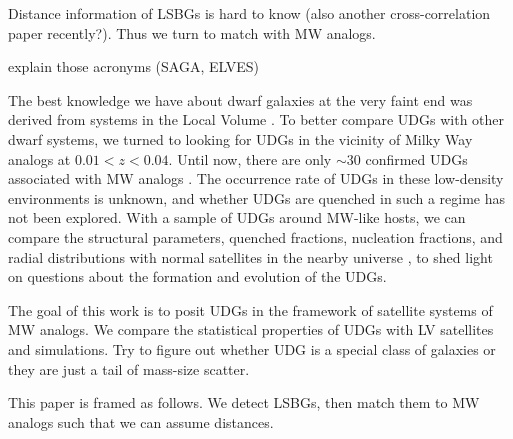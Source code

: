\documentclass[twocolumn,astrosymb,twocolappendix]{aastex631}
\begin{document}
\begin{CJK*}{UTF8}{gbsn}
Distance information of LSBGs is hard to know \citep{Kadowaki2021,Greene2022,Zaritsky2022} (also another cross-correlation paper recently?). Thus we turn to match with MW analogs.

explain those acronyms (SAGA, ELVES)

The best knowledge we have about dwarf galaxies at the very faint end was derived from systems in the Local Volume \citep[e.g.,][]{Simon2019,CarlstenELVES2022}. To better compare UDGs with other dwarf systems, we turned to looking for UDGs in the vicinity of Milky Way analogs at $0.01 < z < 0.04$. Until now, there are only $\sim 30$ confirmed UDGs associated with MW analogs \citep{Cohen2018,SAGA-II,CarlstenELVES2022}. The occurrence rate of UDGs in these low-density environments is unknown, and whether UDGs are quenched in such a regime has not been explored. With a sample of UDGs around MW-like hosts, we can compare the structural parameters, quenched fractions, nucleation fractions, and radial distributions with normal satellites in the nearby universe \citep[e.g.,][]{SAGA-II,CarlstenELVES2022}, to shed light on questions about the formation and evolution of the UDGs.

The goal of this work is to posit UDGs in the framework of satellite systems of MW analogs. We compare the statistical properties of UDGs with LV satellites and simulations. Try to figure out whether UDG is a special class of galaxies or they are just a tail of mass-size scatter. 

This paper is framed as follows. We detect LSBGs, then match them to MW analogs such that we can assume distances. 



\end{CJK*}
\end{document}
